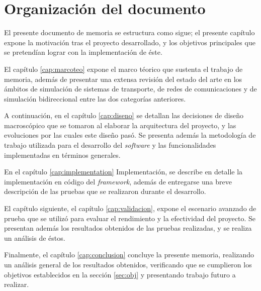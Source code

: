 \section{Organización del documento}

El presente documento de memoria se estructura como sigue; el presente capítulo expone la motivación tras el proyecto desarrollado, y los objetivos principales que se pretendían lograr con la implementación de éste. 

El capítulo \ref{cap:marcoteo} expone el marco téorico que sustenta el trabajo de memoria, además de presentar una extensa revisión del estado del arte en los ámbitos de simulación de sistemas de transporte, de redes de comunicaciones y de simulación bidireccional entre las dos categorías anteriores.

A continuación, en el capítulo \ref{cap:diseno} se detallan las decisiones de diseño macroscópico que se tomaron al elaborar la arquitectura del proyecto, y las evoluciones por las cuales este diseño pasó. Se presenta además la metodología de trabajo utilizada para el desarrollo del \emph{software} y las funcionalidades implementadas en términos generales.

En el capítulo \ref{cap:implementation} Implementación, se describe en detalle la implementación en código del \emph{framework}, además de entregarse una breve descripción de las pruebas que se realizaron durante el desarrollo.

El capítulo siguiente, el capítulo \ref{cap:validacion}, expone el escenario avanzado de prueba que se utilizó para evaluar el rendimiento y la efectividad del proyecto. Se presentan además los resultados obtenidos de las pruebas realizadas, y se realiza un análisis de éstos.

Finalmente, el capítulo \ref{cap:conclusion} concluye la presente memoria, realizando un análisis general de los resultados obtenidos, verificando que se cumplieron los objetivos establecidos en la sección \ref{sec:obj} y presentando trabajo futuro a realizar.

